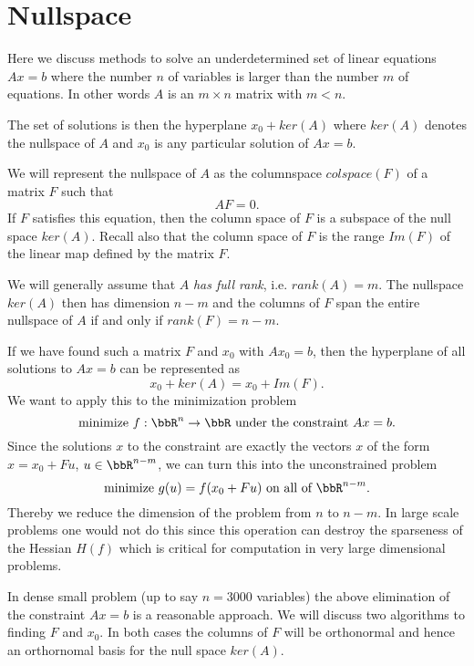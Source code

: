 \section{Nullspace}

Here we discuss methods to solve an underdetermined set of  linear equations 
$Ax=b$ where the number $n$ of variables is larger than the number $m$ of equations.
In other words $A$ is an $m\times n$ matrix with $m<n$.

The set of solutions is then the hyperplane $x_0+ker(A)$ where $ker(A)$ denotes 
the nullspace of $A$ and $x_0$ is any particular solution of $Ax=b$. 

We will represent the nullspace of $A$ as the columnspace
$colspace(F)$ of a matrix $F$ such that 
$$
AF=0.
$$
If $F$ satisfies this equation, then the column space of $F$ is a subspace of 
the null space $ker(A)$. Recall also that the column space of $F$ is the range
$Im(F)$ of the linear map defined by the matrix $F$.

We will generally assume that $A$ \textit{has full rank}, i.e. $rank(A)=m$.
The nullspace $ker(A)$ then has dimension $n-m$ and the columns of $F$ span the entire
nullspace of $A$ if and only if $rank(F)=n-m$.

If we have found such a matrix $F$ and $x_0$ with $Ax_0=b$, then the hyperplane
of all solutions to $Ax=b$ can be represented as
$$
x_0+ker(A)=x_0+Im(F).
$$
We want to apply this to the minimization problem 
%
\begin{equation}
 \label{min_f_eqconstraints}
\text{minimize }f:\bbR^n\to\bbR\text{ under the constraint }Ax=b.
\end{equation}
%
Since the solutions $x$ to the constraint are exactly the vectors
$x$ of the form $x=x_0+Fu$, $u\in\bbR^{n-m}$, we can turn this into the unconstrained
problem
%
\begin{equation}
 \label{min_f_gobal}
\text{minimize }g(u)=f(x_0+Fu)\text{ on all of }\bbR^{n-m}.
\end{equation}
%
Thereby we reduce the dimension of the problem from $n$ to $n-m$. In large scale problems
one would not do this since this operation can destroy the sparseness of the Hessian $H(f)$
which is critical for computation in very large dimensional problems.

In dense small problem (up to say $n=3000$ variables) the 
above elimination of the constraint $Ax=b$ is a reasonable approach. We will discuss two
algorithms to finding $F$ and $x_0$. In both cases the columns of $F$ will be orthonormal
and hence an orthornomal basis for the null space $ker(A)$.



